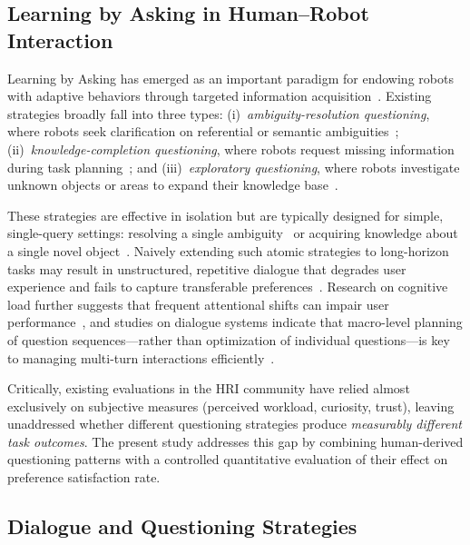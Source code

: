 \documentclass[manuscript,review,anonymous]{acmart}
\begin{document}
\subsection{Learning by Asking in Human--Robot Interaction}
\label{sec:related:lba}

Learning by Asking has emerged as an important paradigm for endowing robots with adaptive behaviors through targeted information acquisition~\cite{hu2025task,shen2025elba}. Existing strategies broadly fall into three types: (i)~\textit{ambiguity-resolution questioning}, where robots seek clarification on referential or semantic ambiguities~\cite{3ren2023robots,4andukuri2024star,5ramrakhya2025grounding,6padmakumar2022teach}; (ii)~\textit{knowledge-completion questioning}, where robots request missing information during task planning~\cite{hu2025task,7uehara2024learning}; and (iii)~\textit{exploratory questioning}, where robots investigate unknown objects or areas to expand their knowledge base~\cite{8leusmann2025investigating,9carter2022you,10leusmann2025developing,11scialom2019ask}.

These strategies are effective in isolation but are typically designed for simple, single-query settings: resolving a single ambiguity~\cite{5ramrakhya2025grounding,7uehara2024learning} or acquiring knowledge about a single novel object~\cite{12biyik2019asking,shen2019learning}. Naively extending such atomic strategies to long-horizon tasks may result in unstructured, repetitive dialogue that degrades user experience and fails to capture transferable preferences~\cite{oviatt2006human,kosch2023survey}. Research on cognitive load further suggests that frequent attentional shifts can impair user performance~\cite{kosch2023survey}, and studies on dialogue systems indicate that macro-level planning of question sequences---rather than optimization of individual questions---is key to managing multi-turn interactions efficiently~\cite{stivers2010overview,kwan2023survey}.

Critically, existing evaluations in the HRI community have relied almost exclusively on subjective measures (perceived workload, curiosity, trust), leaving unaddressed whether different questioning strategies produce \textit{measurably different task outcomes}. The present study addresses this gap by combining human-derived questioning patterns with a controlled quantitative evaluation of their effect on preference satisfaction rate.

\subsection{Dialogue and Questioning Strategies}
\label{sec:related:dialogue}
\end{document}
